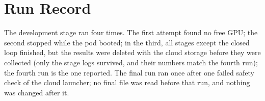 \documentclass[10pt,twocolumn,letterpaper]{article}
\begin{document}
\section{Run Record}

The development stage ran four times. The first attempt found no free GPU; the second stopped while the pod booted; in the third, all stages except the closed loop finished, but the results were deleted with the cloud storage before they were collected (only the stage logs survived, and their numbers match the fourth run); the fourth run is the one reported. The final run ran once after one failed safety check of the cloud launcher; no final file was read before that run, and nothing was changed after it.
\end{document}
